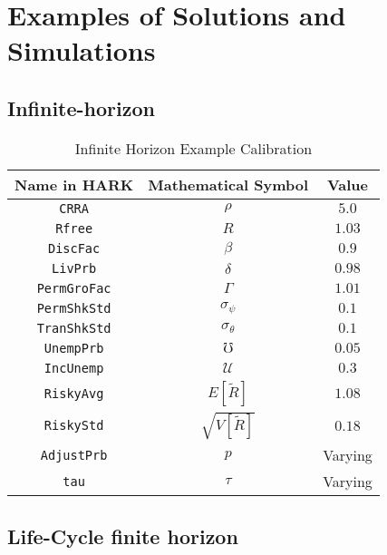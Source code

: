 \documentclass[./RiskyContrib.tex]{subfiles}
\begin{document}
\hypertarget{Examples}{}
\section{Examples of Solutions and Simulations}

\subsection{Infinite-horizon}

\begin{table}
\begin{center}
\caption{Infinite Horizon Example Calibration}\label{tab:inf_calibration}
\begin{tabular}{ccc}
\toprule
Name in HARK & Mathematical Symbol & Value \\
\midrule
\texttt{CRRA} & $\rho$ & $5.0$ \\
\texttt{Rfree} & $R$& $1.03$ \\
\texttt{DiscFac} & $\beta$ & $0.9$ \\
\texttt{LivPrb} & $\delta$ &  $0.98$ \\
\texttt{PermGroFac} & $\Gamma$ &  $1.01$ \\
\texttt{PermShkStd} & $\sigma_\psi$ &  $0.1$ \\
\texttt{TranShkStd} & $\sigma_\theta$ &  $0.1$ \\
\texttt{UnempPrb} & $\mho$ &  $0.05$ \\
\texttt{IncUnemp} & $\mathcal{U}$ &  $0.3$ \\
\texttt{RiskyAvg} & $E[\tilde{R}]$ &  $1.08$ \\
\texttt{RiskyStd} & $\sqrt{V[\tilde{R}]}$ &  $0.18$ \\
\texttt{AdjustPrb} & $p$ &  Varying \\
\texttt{tau} & $\tau$ & Varying \\
\bottomrule
\end{tabular}
\end{center}
\end{table}










\subsection{Life-Cycle finite horizon}
\end{document}
